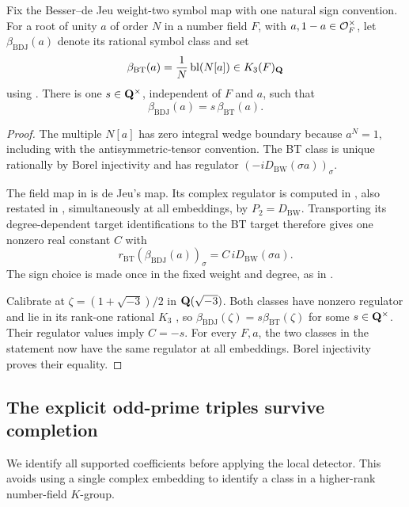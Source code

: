 \begin{lemma}\label{d3:lem:cyclotomicnormalization}
Fix the Besser--de Jeu weight-two symbol map with one natural
sign convention. For a root of unity $a$ of order $N$ in a
number field $F$, with $a,1-a\in\mathcal O_F^\times$, let
$\beta_{\mathrm{BDJ}}(a)$ denote its rational symbol class and set
\[
 \beta_{\mathrm{BT}}(a)=\frac1N\operatorname{bl}(N[a])
       \in K_3(F)_{\mathbf Q}
\]
using \cite[Theorem~4.9]{BunkeTamme}.
There is one $s\in\mathbf Q^\times$, independent of $F$ and $a$, such that
\[
 \beta_{\mathrm{BDJ}}(a)=s\,\beta_{\mathrm{BT}}(a).
\]
\end{lemma}
\begin{proof}
The multiple $N[a]$ has zero integral wedge boundary because
$a^N=1$, including with the antisymmetric-tensor convention.
The BT class is unique rationally by Borel injectivity
\cite[Section~6]{BunkeTamme} and has
regulator $(-iD_{\mathrm{BW}}(\sigma a))_\sigma$.

The field map in \cite[equation~(1.1), Theorem~1.10(1)]{BesserDeJeu}
is de Jeu's map. Its complex regulator is computed in
\cite[Proposition~4.1 and Remark~5.2]{DeJeuWedge}, also restated in \cite[Theorem~2.3]{DeJeuCurves}, simultaneously
at all embeddings, by $P_2=D_{\mathrm{BW}}$.
Transporting its degree-dependent target identifications to the
BT target therefore gives one nonzero real constant $C$ with
\[
 r_{\mathrm{BT}}(\beta_{\mathrm{BDJ}}(a))_\sigma
       =C\,iD_{\mathrm{BW}}(\sigma a).
\]
The sign choice is made once in the fixed weight and degree,
as in \cite[Remark~1.7]{BesserDeJeu}.

Calibrate at $\zeta=(1+\sqrt{-3})/2$ in $\mathbf Q(\sqrt{-3})$.
Both classes have nonzero regulator and lie in its rank-one
rational $K_3$ \cite[Proposition~12.2]{Borel}, so
$\beta_{\mathrm{BDJ}}(\zeta)=s\beta_{\mathrm{BT}}(\zeta)$
for some $s\in\mathbf Q^\times$.
Their regulator values imply $C=-s$.
For every $F,a$, the two classes in the statement now have
the same regulator at all embeddings. Borel injectivity proves
their equality.
\end{proof}


\subsection{The explicit odd-prime triples survive completion}
\label{d3:sec:explicitoddcomplete}

We identify all supported coefficients before applying the local
detector. This avoids using a single complex embedding to identify
a class in a higher-rank number-field $K$-group.

